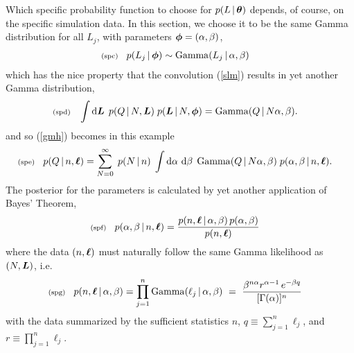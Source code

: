 \documentclass[11pt]{article}
\newcommand{\lleq}[1]{\label{#1} }
\renewcommand{\lleq}[1]{\label{#1} {\scriptstyle {\rm (#1)}} \hspace*{2ex} }
\newcommand{\cond}{\,|\,}
\DeclareMathOperator{\GammaDist}{Gamma}
\newcommand{\rmdx}[1]{\dd{#1}} %
\begin{document}
Which specific probability function to choose for $p(L\cond\bmtheta)$
depends, of course, on the specific simulation data. In this section,
we choose it to be the same Gamma distribution for all $L_j$,
with parameters ${\bm{\phi}} = (\alpha,\beta)$,
\begin{align}
  \lleq{spc}
  p(L_j\cond \bmphi) &\sim \GammaDist(L_j\cond \alpha,\beta)
\end{align}
which has the nice property that the convolution (\ref{slm}) results
in yet another Gamma distribution,
\begin{align}
  \lleq{spd}
  \int \rmdx{\bmL}\; p(Q\cond N,\bmL)\; p(\bmL\cond N,\bmphi)
  &= \GammaDist(Q\cond N\alpha, \beta).
\end{align}
and so (\ref{gmh}) becomes in this example
\begin{align}
  \lleq{spe}
  p(Q\cond n,\bml)
  &= \sum_{N=0}^\infty \;
    p(N\cond n)\;
    \int \rmdx{\alpha}\,\rmdx{\beta}\;
    \GammaDist(Q\cond N\alpha, \beta)\;
    p(\alpha,\beta\cond n,\bml).
\end{align}
The posterior for the parameters is calculated by yet another
application of Bayes' Theorem,
\begin{align}
  \lleq{spf}
  p(\alpha,\beta\cond n,\bml)
  &= \frac{p(n,\bml\cond \alpha,\beta)\,p(\alpha,\beta)}{p(n,\bml)}
\end{align}
where the data $(n,{\bm{\ell}})$ must naturally follow the same
Gamma likelihood as $(N,{\bm{L}})$, i.e.\
\begin{align}
  \lleq{spg}
  p(n,\bml\cond \alpha,\beta)
  & = \prod_{j=1}^n \GammaDist(\ell_j\cond\alpha,\beta)
    \ =\ \frac{\beta^{n\alpha} r^{\alpha-1}\,e^{-\beta q}}{[\Gamma(\alpha)]^n}
\end{align}
with the data summarized by the sufficient statistics $n$,
$q \equiv \sum_{j=1}^n \ell_j$, and $r \equiv \prod_{j=1}^n \ell_j$.
\end{document}
